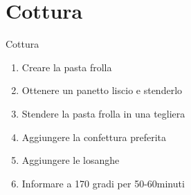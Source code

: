 \section{Cottura}  
\begin{frame}{Cottura}
    \transwipe
    \begin{enumerate}
      \item Creare la pasta frolla
      \item Ottenere un panetto liscio e stenderlo
      \item Stendere la pasta frolla in una tegliera
      \item Aggiungere la confettura preferita
      \item Aggiungere le losanghe
      \item Informare a 170 gradi per 50-60minuti
    \end{enumerate}
\end{frame}

